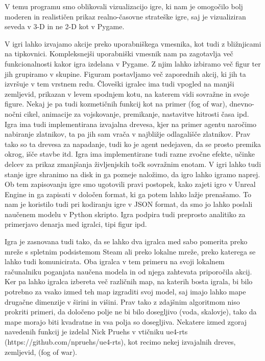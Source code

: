 \documentclass[a4paper, 12pt]{book}
\begin{document}
V temu programu smo oblikovali vizualizacijo igre, ki nam je omogočilo bolj moderen in realističen prikaz realno-časovne strateške igre, saj je vizualiziran seveda v 3-D in ne 2-D kot v Pygame.

V igri lahko izvajamo akcije preko uporabniškega vmesnika, kot tudi z bližnjicami na tipkovnici.
Kompleksnejši uporabniški vmesnik nam pa zagotavlja več funkcionalnosti kakor igra izdelana v Pygame.
Z njim lahko izbiramo več figur ter jih grupiramo v skupine.
Figuram postavljamo več zaporednih akcij, ki jih ta izvršuje v tem vrstnem redu.
Človeški igralec ima tudi vpogled na manjši zemljevid, prikazan v levem spodnjem kotu, na katerem vidi sovražne in svoje figure.
Nekaj je pa tudi kozmetičnih funkcij kot na primer (fog of war), dnevno-nočni cikel, animacije za vojskovanje, premikanje, nastavitve hitrosti časa ipd.
Igra ima tudi implementirana izvajalna drevesa, kjer na primer agentu naročimo nabiranje zlatnikov, ta pa jih sam vrača v najbližje odlagališče zlatnikov.
Prav tako so ta drevesa za napadanje, tudi ko je agent nedejaven, da se prosto premika okrog, išče stavbe itd.
Igra ima implementirane tudi razne zvočne efekte, učinke delcev za prikaz zmanjšanja življenjskih točk sovražnim enotam.
V igri lahko tudi stanje igre shranimo na disk in ga pozneje naložimo, da igro lahko igramo naprej.
Ob tem zapisovanju igre smo ugotovili pravi postopek, kako zajeti igro v Unreal Engine in ga zapisati v določen format, ki ga potem lahko lažje prenašamo.
To nam je koristilo tudi pri kodiranju igre v JSON format, da smo jo lahko poslali naučenem modelu v Python skripto.
Igra podpira tudi preprosto analitiko za primerjavo denarja med igralci, tipi figur ipd.

Igra je zasnovana tudi tako, da se lahko dva igralca med sabo pomerita preko mreže s spletnim podsistemom Steam ali preko lokalne mreže, preko katerega se lahko tudi komunicirata.
Oba igralca v tem primeru na svoji lokalnem računalniku poganjata naučena modela in od njega zahtevata priporočila akcij.
Ker pa lahko igralca izbereta več različnih map, na katerih bosta igrala, bi bilo potrebno za vsako izmed teh map izgraditi svoj model, saj imajo lahko mape drugačne dimenzije v širini in višini.
Prav tako z zdajšnim algoritmom niso prokriti primeri, da določeno polje ne bi bilo dosegljivo (voda, skalovje), tako da mape morajo biti kvadratne in vsa polja so dosegljiva.
Nekatere izmed zgoraj navedenih funkcij je izdelal Nick Pruehs v vtičniku ue4-rts (https://github.com/npruehs/ue4-rts), kot recimo nekej izvajalnih dreves, zemljevid, (fog of war).
\end{document}

